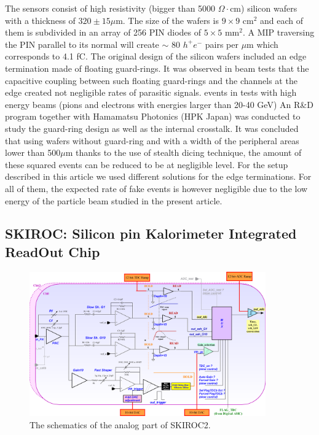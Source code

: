 \documentclass[a4paper,11pt]{article}
\begin{document}
The sensors consist of high resistivity (bigger than 5000 $\Omega\cdot$cm)
silicon wafers with a thickness of $320\pm15\mu$m.
The size of the wafers is $9\times9$ cm$^{2}$ and each of them is subdivided in an array of 256 PIN diodes of $5\times5$ mm$^{2}$.
A MIP traversing the PIN parallel to its normal will create $\sim$ 80 $h^{+}e^{-}$ pairs per $\mu$m which corresponds to 4.1 fC.
The original design of the silicon wafers included an edge termination made of floating guard-rings.
It was observed in beam tests \cite{Cornat:2015eoa,Cornat:2009zz} that the capacitive coupling between such floating guard-rings 
and the channels at the edge created not negligible rates of parasitic signals.
events in tests with high energy beams (pions and electrons with energies larger than 20-40 GeV)
An R\&D program together with Hamamatsu Photonics (HPK Japan) was conducted to study the guard-ring design 
as well as the internal crosstalk. It was concluded that using wafers without guard-ring and with a width of the peripheral areas lower than 
500$\mu$m thanks to the use of stealth dicing technique, the amount of these squared events 
can be reduced to be at negligible level.
For the setup described in this article we used different solutions for the edge terminations.
For all of them, the expected rate of fake events is however negligible due to
the low energy of the particle beam studied in the present article.

\subsection{SKIROC: Silicon pin Kalorimeter Integrated ReadOut Chip}
\label{sec:skiroc}

\begin{figure}[!ht]
  \centering
    \includegraphics[width=4in]{skiroc2_block.png}
\caption{The schematics of the analog part of SKIROC2.}
\label{SKIROC2}
\end{figure}
\end{document}
